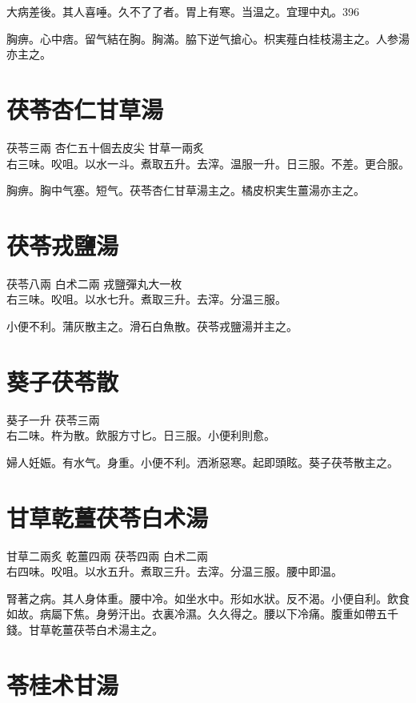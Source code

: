 大病差後。其人喜唾。久不了了者。胃上有寒。当温之。宜理中丸。396

胸痹。心中痞。留气結在胸。胸滿。脇下逆{\khaaitp 气}搶心。枳実薤白桂枝湯主之。人参湯亦主之。

\section{茯苓杏仁甘草湯}

茯苓{\scriptsize 三兩} 杏仁{\scriptsize 五十個去皮尖} 甘草{\scriptsize 一兩炙}\\
右三味。㕮咀。以水一斗。煮取五升。去滓。温服一升。日三服。不差。更合服。

胸痹。胸中气塞。短气。茯苓杏仁甘草湯主之。橘{\khaaitp 皮}枳{\khaaitp 実生}薑湯亦主之。

\section{茯苓戎鹽湯}

茯苓{\scriptsize 八兩} 白术{\scriptsize 二兩} 戎鹽{\scriptsize 彈丸大一枚}\\
右三味。㕮咀。以水七升。煮取三升。去滓。分温三服。

小便不利。蒲灰散主之。滑石白魚散。茯苓戎鹽湯并主之。

\section{葵子茯苓散}

葵子{\scriptsize 一升} 茯苓{\scriptsize 三兩}\\
右二味。杵为散。飲服方寸匕。日三服。小便利則愈。

{\khaaitp 婦人}妊娠。有水气。身重。小便不利。洒淅惡寒。起即頭眩。葵子茯苓散主之。

\section{甘草乾薑茯苓白术湯}

甘草{\scriptsize 二兩炙} 乾薑{\scriptsize 四兩} 茯苓{\scriptsize 四兩} 白术{\scriptsize 二兩}\\
右四味。㕮咀。以水五升。煮取三升。去滓。分温三服。腰中即温。

腎著之病。其人身体重。腰中冷。如坐水中。形如水狀。反不渴。小便自利。飲食如故。病屬下焦。身勞汗出。衣裏冷濕。久久得之。腰以下冷痛。腹重如帶五千錢。甘{\khaaitp 草乾}薑{\khaaitp 茯}苓{\khaaitp 白}术湯主之。

\section{苓桂术甘湯}

